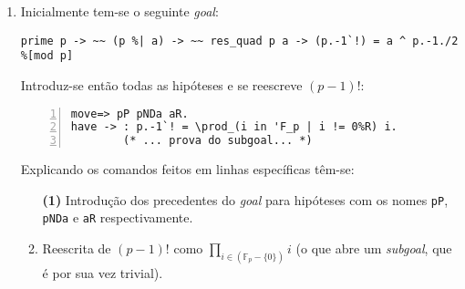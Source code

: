 
\begin{enumerate}[label=\textbf{\roman*.}]


        \item Inicialmente tem-se o seguinte \textit{goal}:
                \begin{lstlisting}[language=coq,frame=single,tabsize=1]
prime p -> ~~ (p %| a) -> ~~ res_quad p a -> (p.-1`!) = a ^ p.-1./2 %[mod p]
                \end{lstlisting}
        Introduz-se então todas as hipóteses e se reescreve $(p-1)!$:
                \begin{lstlisting}[language=coq,frame=single, numbers=left,stepnumber=1,tabsize=1,name=proof]
move=> pP pNDa aR.
have -> : p.-1`! = \prod_(i in 'F_p | i != 0%R) i.
        (* ... prova do subgoal... *)
                \end{lstlisting}
        Explicando os comandos feitos em linhas específicas têm-se:
        \begin{enumerate}
                \item[\textbf{(1)}] Introdução dos precedentes do \textit{goal} para hipóteses com os nomes \lstinline[language=coq]|pP|, \lstinline[language=coq]|pNDa| e \lstinline[language=coq]|aR| respectivamente.
                
                \item[\textbf{(2)}] Reescrita de $(p-1)!$ como $\prod_{i \in (\mathbb{F}_p - \{0\})} i$ (o que abre um \textit{subgoal}, que é por sua vez trivial).
                
        \end{enumerate}



\end{enumerate}
